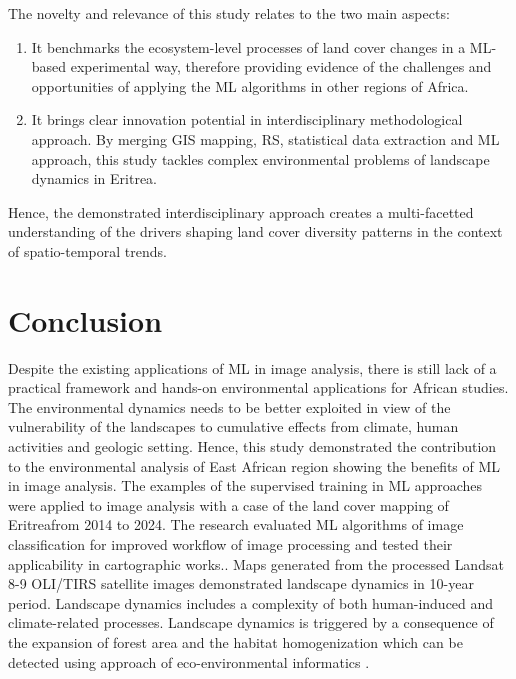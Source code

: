 \documentclass[sn-mathphys-num]{sn-jnl}%
\theoremstyle{thmstyleone}%
\theoremstyle{thmstyletwo}%
\theoremstyle{thmstylethree}%
\begin{document}
{The novelty and relevance of this study relates to the two main aspects:} 
\begin{enumerate} 
	\item {It benchmarks the ecosystem-level processes of land cover changes in a ML-based experimental way, therefore providing evidence of the challenges and opportunities of applying the ML algorithms in other regions of Africa. }
	\item {It brings clear innovation potential in interdisciplinary methodological approach. By merging GIS mapping, RS, statistical data extraction and ML approach, this study tackles complex environmental problems of landscape dynamics in Eritrea.}
\end{enumerate} 
{Hence, the demonstrated interdisciplinary approach creates a multi-facetted understanding of the drivers shaping land cover diversity patterns in the context of spatio-temporal trends.}

\section{Conclusion}\label{sec13}

{Despite the existing applications of ML in image analysis, there is still} lack of a practical framework and hands-on environmental applications {for African studies. The environmental dynamics }needs to be better exploited in view of the{ vulnerability of the landscapes to cumulative effects from climate, human activities and geologic setting}. Hence, this study demonstrated the {contribution to the environmental analysis of East African region showing the }benefits of ML {in image analysis}. The examples of the supervised training in ML approaches {were applied to image analysis} with a case of the {land cover} mapping of Eritrea{from 2014 to 2024}. The research evaluated ML algorithms of image classification for improved workflow of image processing and tested their applicability in cartographic works.{. }Maps generated from the processed {Landsat 8-9 OLI/TIRS} satellite images demonstrated {landscape dynamics in 10-year period}.  Landscape dynamics includes a complexity of both human-induced and climate-related processes. Landscape dynamics is triggered by a consequence of the expansion of forest area and the habitat homogenization {which can be detected using approach of eco-environmental informatics} \cite{Yue2025}. 
\end{document}
